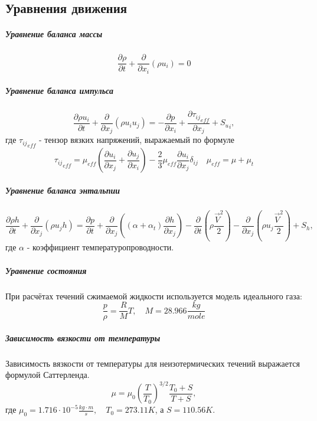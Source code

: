 \subsection{Уравнения движения}
		\subparagraph{Уравнение баланса массы\\}
			\begin{equation}
				\frac{\partial \rho}{\partial t} + \frac{\partial}{\partial x_i}(\rho u_i) = 0
			\end{equation}
		\subparagraph{Уравнение баланса импульса\\}
			\begin{equation}
				\frac{\partial \rho u_i}{\partial t} + \frac{\partial}{\partial x_j}(\rho u_iu_j) = - \frac{\partial p}{\partial x_i} + \frac{\partial {\tau_{ij}}_{eff}}{\partial x_j} + {S_u}_i,
				\label{flowEqn}
			\end{equation}
			где ${\tau_{ij}}_{eff}$ - тензор вязких напряжений, выражаемый по формуле
			\begin{equation}
				{\tau_{ij}}_{eff} = \mu_{eff}\left( \frac{\partial u_i}{\partial x_j} + \frac{\partial u_j}{\partial x_i} \right) - \frac{2}{3}\mu_{eff}\frac{\partial u_i}{\partial x_j} \delta_{ij} \quad \mu_{eff} = \mu + \mu_{t}
			\end{equation}
		\subparagraph{Уравнение баланса энтальпии\\}
		\begin{equation}
			\frac{\partial \rho h}{\partial t} + \frac{\partial}{\partial x_j} (\rho u_j h) = \frac{\partial p}{\partial t} + \frac{\partial}{\partial x_j} \left((\alpha + \alpha_t) \frac{\partial h}{\partial x_j}\right) - \frac{\partial}{\partial t}\left(\rho \frac{\vec{V}^2}{2}\right) - \frac{\partial}{\partial x_j}\left(\rho u_j \frac{\vec{V}^2}{2}\right) + S_h,
			\label{thermoEqn}
		\end{equation}
		 где $\alpha$ - коэффициент температуропроводности.
		\subparagraph{Уравнение состояния\\}
			\hspace{2em}При расчётах течений сжимаемой жидкости используется модель идеального газа:
			\begin{equation}
				\frac{p}{\rho} = \frac{R}{M}T, \quad M = 28.966 \frac{kg}{mole}
			\end{equation}
		\subparagraph{Зависимость вязкости от температуры\\}
				\hspace{2em}Зависимость вязкости от температуры для неизотермических течений выражается формулой Саттерленда.
				\begin{equation}
					\mu = \mu_0 \left(\frac{T}{T_0}\right)^{3/2} \frac{T_0 + S}{T + S},
				\end{equation}
					где $\mu_0 = 1.716 \cdot 10^{-5} \frac{kg \cdot m}{s}, \quad T_0 = 273.11 K$, а $S=110.56 K$.
					

